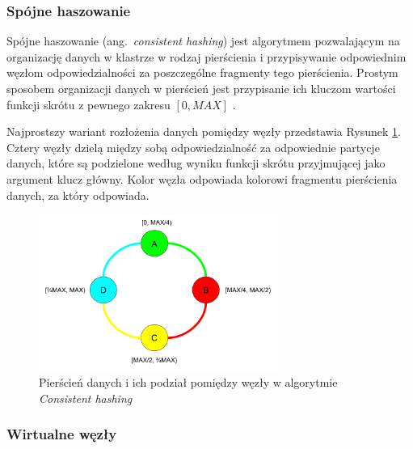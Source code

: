 \subsubsection{Spójne haszowanie}

Spójne haszowanie (ang.~\textit{consistent hashing}) jest algorytmem pozwalającym na organizację danych w klastrze w rodzaj pierścienia i przypisywanie odpowiednim węzłom odpowiedzialności za poszczególne fragmenty tego pierścienia. 
Prostym sposobem organizacji danych w pierścień jest przypisanie ich kluczom wartości funkcji skrótu z pewnego zakresu $\left[0, MAX\right]$ \cite{consistentHashing}.

Najprostszy wariant rozłożenia danych pomiędzy węzły przedstawia Rysunek \ref{fig:cassandraConsistenHashing}.
Cztery węzły dzielą między sobą odpowiedzialność za odpowiednie partycje danych, które są podzielone według wyniku funkcji skrótu przyjmującej jako argument klucz główny.
Kolor węzła odpowiada kolorowi fragmentu pierścienia danych, za który odpowiada.

\begin{figure}[!ht]
\centering
\includegraphics[width=0.7\textwidth]{figures/consisten_hashing.png}
\caption{Pierścień danych i ich podział pomiędzy węzły w algorytmie \textit{Consistent hashing}}
\label{fig:cassandraConsistenHashing}
\end{figure}

\subsubsection{Wirtualne węzły}

